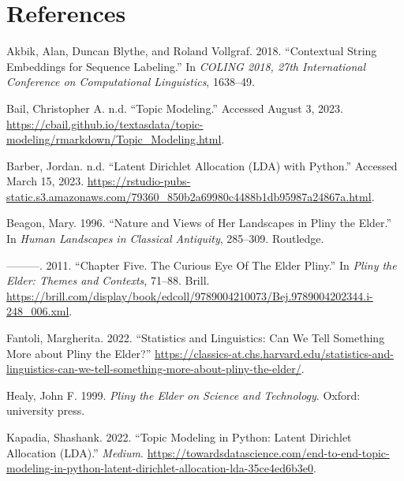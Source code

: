 \documentclass[
  12pt,
]{article}
\newlength{\cslhangindent}
\newlength{\cslentryspacingunit} %
\newenvironment{CSLReferences}[2] %
 {%
  \setlength{\parindent}{0pt}
  \ifodd #1
  \let\oldpar\par
  \def\par{\hangindent=\cslhangindent\oldpar}
  \fi
  \setlength{\parskip}{#2\cslentryspacingunit}
 }%
 {}
\begin{document}
\newpage

\hypertarget{references}{%
\section*{References}\label{references}}

\hypertarget{refs}{}
\begin{CSLReferences}{1}{0}
\leavevmode{}%
Akbik, Alan, Duncan Blythe, and Roland Vollgraf. 2018. {``Contextual
String Embeddings for Sequence Labeling.''} In \emph{{COLING} 2018, 27th
International Conference on Computational Linguistics}, 1638--49.

\leavevmode{}%
Bail, Christopher A. n.d. {``Topic {Modeling}.''} Accessed August 3,
2023.
\url{https://cbail.github.io/textasdata/topic-modeling/rmarkdown/Topic_Modeling.html}.

\leavevmode{}%
Barber, Jordan. n.d. {``Latent {Dirichlet} {Allocation} ({LDA}) with
{Python}.''} Accessed March 15, 2023.
\url{https://rstudio-pubs-static.s3.amazonaws.com/79360_850b2a69980c4488b1db95987a24867a.html}.

\leavevmode{}%
Beagon, Mary. 1996. {``Nature and Views of Her Landscapes in {Pliny} the
{Elder}.''} In \emph{Human {Landscapes} in {Classical} {Antiquity}},
285--309. Routledge.

\leavevmode{}%
---------. 2011. {``Chapter {Five}. {The} {Curious} {Eye} {Of} {The}
{Elder} {Pliny}.''} In \emph{Pliny the {Elder}: {Themes} and
{Contexts}}, 71--88. Brill.
\url{https://brill.com/display/book/edcoll/9789004210073/Bej.9789004202344.i-248_006.xml}.

\leavevmode{}%
Fantoli, Margherita. 2022. {``Statistics and Linguistics: Can We Tell
Something More about {Pliny} the {Elder}?''}
\url{https://classics-at.chs.harvard.edu/statistics-and-linguistics-can-we-tell-something-more-about-pliny-the-elder/}.

\leavevmode{}%
Healy, John F. 1999. \emph{Pliny the {Elder} on Science and Technology}.
Oxford: university press.

\leavevmode{}%
Kapadia, Shashank. 2022. {``Topic {Modeling} in {Python}: {Latent}
{Dirichlet} {Allocation} ({LDA}).''} \emph{Medium}.
\url{https://towardsdatascience.com/end-to-end-topic-modeling-in-python-latent-dirichlet-allocation-lda-35ce4ed6b3e0}.


\end{CSLReferences}
\end{document}
